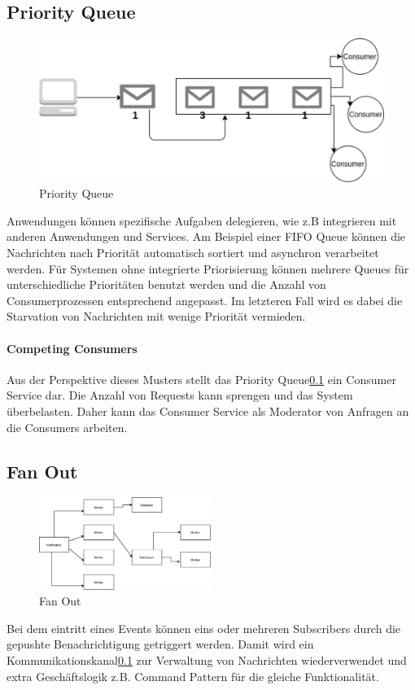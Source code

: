 \documentclass[
12pt,
english,
ngerman,
headsepline,
twoside,
openright,
numbers=noenddot,version=first
]{scrreprt}
\begin{document}
\subsection{Priority Queue}\label{sec:priority-queue}
\begin{figure}
	\includegraphics[scale=0.36]{./pics/pattern-priority-queue.eps}
	\caption{Priority Queue}
	\label{pic:priority-queue}
\end{figure}
Anwendungen können spezifische Aufgaben delegieren, wie z.B integrieren mit anderen Anwendungen und Services. Am Beispiel einer FIFO Queue können die Nachrichten nach Priorität automatisch sortiert und asynchron verarbeitet werden. Für Systemen ohne integrierte Priorisierung können mehrere Queues für unterschiedliche Prioritäten benutzt werden und die Anzahl von Consumerprozessen entsprechend angepasst. Im letzteren Fall wird es dabei die Starvation von Nachrichten mit wenige Priorität vermieden.

\paragraph{Competing Consumers}
Aus der Perspektive dieses Musters stellt das Priority Queue\ref{sec:priority-queue} ein Consumer Service dar. Die Anzahl von Requests kann sprengen und das System überbelasten. Daher kann das Consumer Service als Moderator von Anfragen an die Consumers arbeiten. 



\subsection{Fan Out}
\label{sec:fan-out}
\begin{figure}
	\includegraphics[height=3cm]{./pics/pattern-fan-out.eps}
	\caption{Fan Out}
	\label{pic:fan-out}
\end{figure}
Bei dem eintritt eines Events können eins oder mehreren Subscribers durch die gepushte Benachrichtigung getriggert werden. Damit wird ein Kommunikationskanal\ref{sec:priority-queue} zur Verwaltung von Nachrichten wiederverwendet und extra Geschäftslogik z.B. Command Pattern für die gleiche Funktionalität\cite{serverlessArchAWS}.
\end{document}
